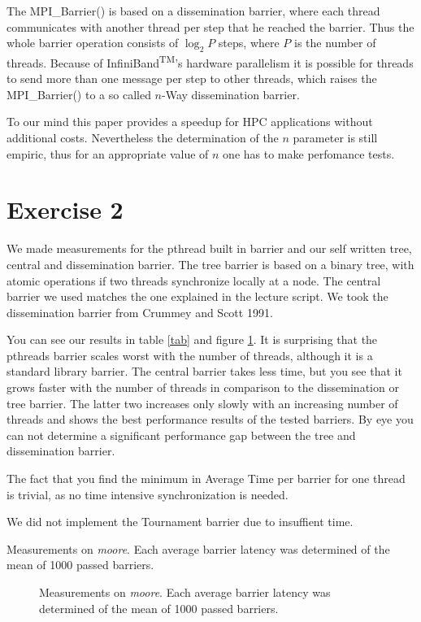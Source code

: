 \documentclass[oneside,a4paper]{scrartcl}
\begin{document}
The MPI\_Barrier() is based on a dissemination barrier, where each thread
communicates with another thread per step that he reached the barrier.
Thus the whole barrier operation consists of $\log_2 P$ steps, where
$P$ is the number of threads. Because of InfiniBand\textsuperscript{TM}'s hardware
parallelism it is possible for threads to send more than one message per step
to other threads, which raises the MPI\_Barrier() to a so called $n$-Way dissemination
barrier.

To our mind this paper provides a speedup for HPC applications without additional costs.
Nevertheless the determination of the $n$ parameter is still empiric, thus
for an appropriate value of $n$ one has to make perfomance tests.

\section*{Exercise 2}

We made measurements for the pthread built in barrier and
our self written tree, central and dissemination barrier.
The tree barrier is based on a binary tree, with atomic
operations if two threads synchronize locally at a node.
The central barrier we used matches the one explained in
the lecture script. We took the dissemination barrier from
Crummey and Scott 1991.

You can see our results in table \ref{tab} and figure \ref{bar}.
It is surprising that the pthreads barrier scales worst
with the number of threads, although it is a standard
library barrier. The central barrier takes less time,
but you see that it grows faster with the number of
threads in comparison to the dissemination or tree barrier.
The latter two increases only slowly with an increasing
number of threads and shows the best performance results
of the tested barriers. By eye you can not determine
a significant performance gap between the tree and
dissemination barrier.

The fact that you find the minimum in Average Time per
barrier for one thread is trivial, as no time intensive 
synchronization is needed.

We did not implement the Tournament barrier due to
insuffient time.

\begin{table}
	\centering
	\caption{Measurements on \emph{moore}. Each average
		barrier latency was determined of the mean of
		1000 passed barriers.}

	\label{tab}
\end{table}

\begin{figure}
	\centering
	\caption{Measurements on \emph{moore}. Each average
		barrier latency was determined of the mean of
		1000 passed barriers.}
	\label{bar}
\end{figure}
\end{document}
